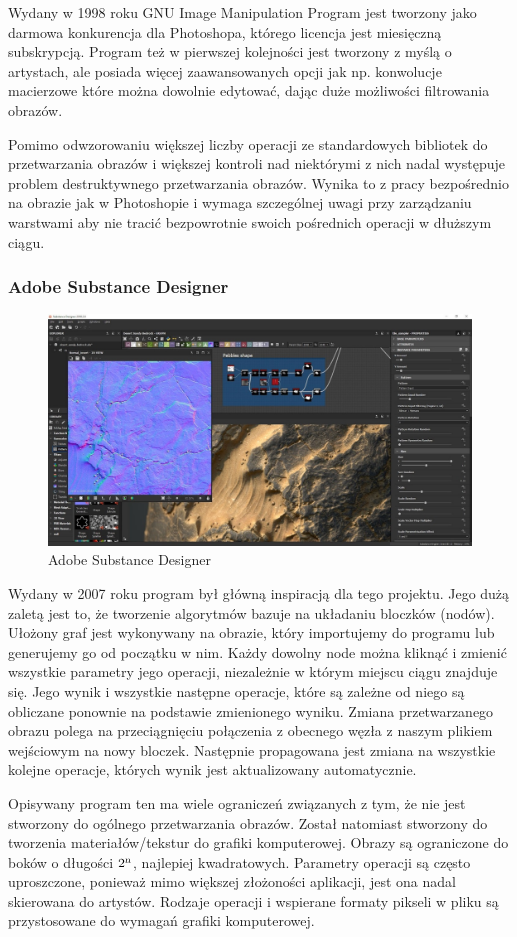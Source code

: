 Wydany w 1998 roku GNU Image Manipulation Program jest tworzony jako darmowa konkurencja dla Photoshopa, którego licencja jest miesięczną subskrypcją. Program też w pierwszej kolejności jest tworzony z myślą o artystach, ale posiada więcej zaawansowanych opcji jak np. konwolucje macierzowe które można dowolnie edytować, dając duże możliwości filtrowania obrazów.

Pomimo odwzorowaniu większej liczby operacji ze standardowych bibliotek do przetwarzania obrazów i większej kontroli nad niektórymi z nich nadal występuje problem destruktywnego przetwarzania obrazów. Wynika to z pracy bezpośrednio na obrazie jak w Photoshopie i wymaga szczególnej uwagi przy zarządzaniu warstwami aby nie tracić bezpowrotnie swoich pośrednich operacji w dłuższym ciągu.

\subsubsection{Adobe Substance Designer}
\begin{figure}[H]
    \centering
    \includegraphics{./images/Picture6.jpg}
    \caption{Adobe Substance Designer}
    \label{fig:designer}
\end{figure}

Wydany w 2007 roku program był główną inspiracją dla tego projektu. 
Jego dużą zaletą jest to, że tworzenie algorytmów bazuje na układaniu bloczków (nodów). 
Ułożony graf jest wykonywany na obrazie, który importujemy do programu lub generujemy go od początku w nim. 
Każdy dowolny node można kliknąć i zmienić wszystkie parametry jego operacji, niezależnie w którym miejscu ciągu znajduje się.
Jego wynik i wszystkie następne operacje, które są zależne od niego są obliczane ponownie na podstawie zmienionego wyniku. 
Zmiana przetwarzanego obrazu polega na przeciągnięciu połączenia z obecnego węzła z naszym plikiem wejściowym na nowy bloczek. Następnie propagowana jest zmiana na wszystkie kolejne operacje, których wynik jest aktualizowany automatycznie.

Opisywany program ten ma wiele ograniczeń związanych z tym, że nie jest stworzony do ogólnego przetwarzania obrazów. Został natomiast stworzony do tworzenia materiałów/tekstur do grafiki komputerowej. 
Obrazy są ograniczone do boków o długości $2\textsuperscript{n}$, najlepiej kwadratowych. 
Parametry operacji są często uproszczone, ponieważ mimo większej złożoności aplikacji, jest ona nadal skierowana do artystów. 
Rodzaje operacji i wspierane formaty pikseli w pliku są przystosowane do wymagań grafiki komputerowej.
